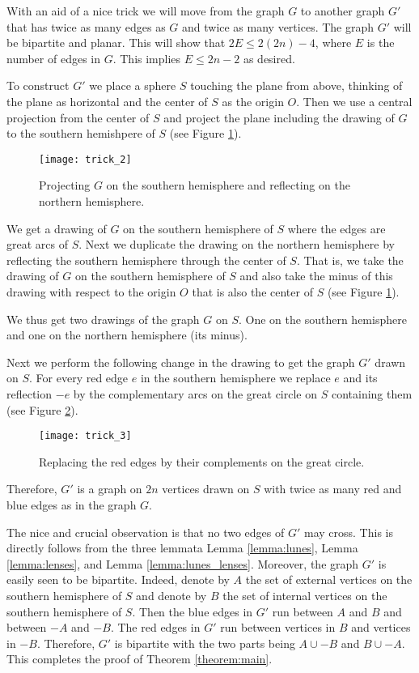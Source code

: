 \documentclass[11pt,a4paper]{article}
\renewcommand{\leq}{\leqslant}
\newcommand{\bbox}{\vrule height7pt width4pt depth1pt}
\begin{document}
With an aid of a nice trick we will move from the graph $G$ to another graph $G'$
that has twice as many edges as $G$ and twice as many vertices. The graph $G'$ will be bipartite and planar. This will show that $2E \leq 2(2n)-4$, where $E$ is the number of edges in $G$. This implies $E \leq 2n-2$ as desired.

To construct $G'$ we place a sphere $S$ touching the plane from above, thinking of the plane as horizontal and the center of $S$ as the origin $O$.
Then we use a central projection from the center of $S$ and project the plane including the drawing of $G$ to the southern hemishpere of $S$ (see Figure \ref{fig:trick_2}).

\begin{figure}[ht]
	\centering
	\texttt{[image: trick\_2]}
	\caption{Projecting $G$ on the southern hemisphere and reflecting on the northern hemisphere.}
	\label{fig:trick_2}
\end{figure}

We get a drawing of $G$ on the southern hemisphere of $S$ where the edges are great arcs of $S$. Next we duplicate the drawing on the northern hemisphere
by reflecting the southern hemisphere through the center of $S$. That is,
we take the drawing of $G$ on the southern hemisphere of $S$ and also take the minus of this drawing with respect to the origin $O$ that is also the center of $S$ (see Figure \ref{fig:trick_2}).

We thus get two drawings of the graph $G$ on $S$. One on the southern hemisphere and one on the northern hemisphere (its minus).

Next we perform the following change in the drawing to get the graph $G'$ drawn on $S$.
For every red edge $e$ in the southern hemisphere we replace $e$ and its reflection $-e$ by the complementary arcs
on the great circle on $S$ containing them (see Figure \ref{fig:trick_3}).

\begin{figure}[ht]
	\centering
	\texttt{[image: trick\_3]}
	\caption{Replacing the red edges by their complements on the great circle.}
	\label{fig:trick_3}
\end{figure}

Therefore, $G'$ is a graph on $2n$ vertices
drawn on $S$ with twice as many red and blue edges as in the graph $G$.

The nice and crucial observation is that no two edges of $G'$ may cross.
This is directly follows from the three lemmata Lemma \ref{lemma:lunes}, Lemma \ref{lemma:lenses}, and Lemma \ref{lemma:lunes_lenses}. Moreover,
the graph $G'$ is easily seen to be bipartite. Indeed, denote by $A$ the set of external vertices on the southern hemisphere of $S$ and denote by $B$ the set of internal vertices on the southern hemisphere of $S$. Then the blue edges in $G'$ run between $A$ and $B$ and between $-A$ and $-B$. The red edges in $G'$ run
between vertices in $B$ and vertices in $-B$. Therefore, $G'$ is bipartite with the two parts being $A \cup -B$ and $B \cup -A$. This completes the proof of Theorem \ref{theorem:main}.
\bbox
\end{document}
